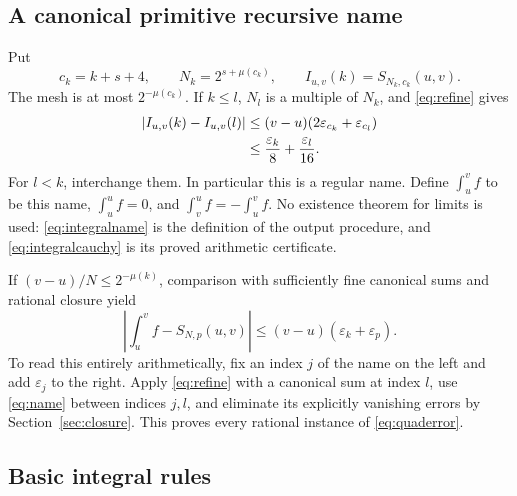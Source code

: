 \documentclass[11pt]{article}
\theoremstyle{definition}
\newcommand{\eps}{\varepsilon}
\newcommand{\abs}[1]{\left|#1\right|}
\begin{document}
\subsection{A canonical primitive recursive name}

Put
\begin{equation}
 c_k=k+s+4,\qquad N_k=2^{s+\mu(c_k)},\qquad
 I_{u,v}(k)=S_{N_k,c_k}(u,v).\label{eq:integralname}
\end{equation}
The mesh is at most \(2^{-\mu(c_k)}\).  If \(k\le l\), \(N_l\) is
a multiple of \(N_k\), and \eqref{eq:refine} gives
\begin{align}
 \abs{I_{u,v}(k)-I_{u,v}(l)}
 &\le(v-u)(2\eps_{c_k}+\eps_{c_l})\notag\\
 &\le\frac{\eps_k}{8}+\frac{\eps_l}{16}.\label{eq:integralcauchy}
\end{align}
For \(l<k\), interchange them.  In particular this is a regular name.
Define \(\int_u^v f\) to be this name, \(\int_u^u f=0\), and
\(\int_v^u f=-\int_u^v f\).  No existence theorem for limits is used:
\eqref{eq:integralname} is the definition of the output procedure, and
\eqref{eq:integralcauchy} is its proved arithmetic certificate.

If \((v-u)/N\le2^{-\mu(k)}\), comparison with sufficiently fine
canonical sums and rational closure yield
\begin{equation}
 \abs{\int_u^v f-S_{N,p}(u,v)}
 \le(v-u)(\eps_k+\eps_p).\label{eq:quaderror}
\end{equation}
To read this entirely arithmetically, fix an index \(j\) of the name
on the left and add \(\eps_j\) to the right.  Apply
\eqref{eq:refine} with a canonical sum at index \(l\), use
\eqref{eq:name} between indices \(j,l\), and eliminate its explicitly
vanishing errors by Section~\ref{sec:closure}.  This proves every
rational instance of \eqref{eq:quaderror}.

\subsection{Basic integral rules}
\end{document}
